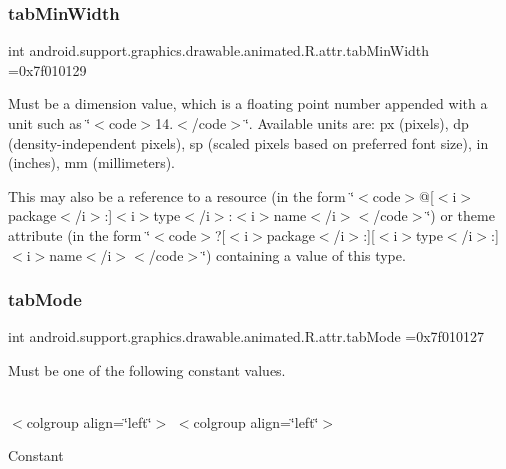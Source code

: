 \subsubsection{\texorpdfstring{tab\+Min\+Width}{tabMinWidth}}
{\footnotesize\ttfamily int android.\+support.\+graphics.\+drawable.\+animated.\+R.\+attr.\+tab\+Min\+Width =0x7f010129\hspace{0.3cm}{\ttfamily [static]}}

Must be a dimension value, which is a floating point number appended with a unit such as \char`\"{}$<$code$>$14.\+5sp$<$/code$>$\char`\"{}. Available units are\+: px (pixels), dp (density-\/independent pixels), sp (scaled pixels based on preferred font size), in (inches), mm (millimeters). 

This may also be a reference to a resource (in the form \char`\"{}$<$code$>$@\mbox{[}$<$i$>$package$<$/i$>$\+:\mbox{]}$<$i$>$type$<$/i$>$\+:$<$i$>$name$<$/i$>$$<$/code$>$\char`\"{}) or theme attribute (in the form \char`\"{}$<$code$>$?\mbox{[}$<$i$>$package$<$/i$>$\+:\mbox{]}\mbox{[}$<$i$>$type$<$/i$>$\+:\mbox{]}$<$i$>$name$<$/i$>$$<$/code$>$\char`\"{}) containing a value of this type. \mbox{\label{classandroid_1_1support_1_1graphics_1_1drawable_1_1animated_1_1R_1_1attr_af2d17a287c41f10260f6a47f6cc9ccda}} 
\subsubsection{\texorpdfstring{tab\+Mode}{tabMode}}
{\footnotesize\ttfamily int android.\+support.\+graphics.\+drawable.\+animated.\+R.\+attr.\+tab\+Mode =0x7f010127\hspace{0.3cm}{\ttfamily [static]}}

Must be one of the following constant values.

\tabulinesep=1mm
\begin{longtabu} spread 0pt [c]{*{0}{|X[-1]}|}
\hline
\end{longtabu}
$<$colgroup align=\char`\"{}left\char`\"{}$>$ $<$colgroup align=\char`\"{}left\char`\"{}$>$ 

Constant

